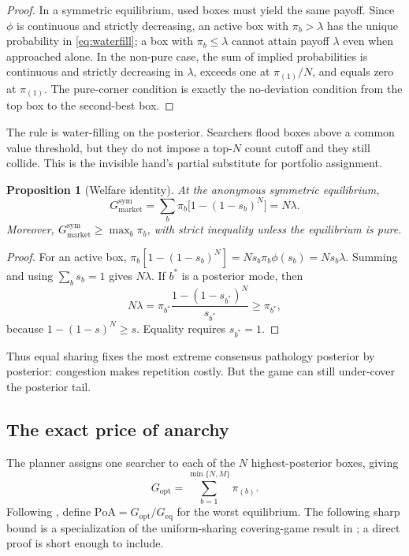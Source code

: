 \documentclass[11pt]{article}
\newtheorem{proposition}{Proposition}
\theoremstyle{definition}
\theoremstyle{remark}
\newcommand{\1}{\mathbf{1}}
\newcommand{\opt}{\mathrm{opt}}
\newcommand{\mkt}{\mathrm{market}}
\newcommand{\PoA}{\mathrm{PoA}}
\begin{document}
\begin{proof}
In a symmetric equilibrium, used boxes must yield the same payoff. Since $\phi$ is continuous and strictly decreasing, an active box with $\pi_b>\lambda$ has the unique probability in \cref{eq:waterfill}; a box with $\pi_b\le\lambda$ cannot attain payoff $\lambda$ even when approached alone. In the non-pure case, the sum of implied probabilities is continuous and strictly decreasing in $\lambda$, exceeds one at $\pi_{(1)}/N$, and equals zero at $\pi_{(1)}$. The pure-corner condition is exactly the no-deviation condition from the top box to the second-best box.
\end{proof}

The rule is water-filling on the posterior. Searchers flood boxes above a common value threshold, but they do not impose a top-$N$ count cutoff and they still collide. This is the invisible hand's partial substitute for portfolio assignment.

\begin{proposition}[Welfare identity]
\label{prop:welfare}
At the anonymous symmetric equilibrium,
\begin{equation}
G_{\mkt}^{\mathrm{sym}}
=\sum_b\pi_b\bigl[1-(1-s_b)^N\bigr]
=N\lambda.
\label{eq:welfare-identity}
\end{equation}
Moreover, $G_{\mkt}^{\mathrm{sym}}\ge\max_b\pi_b$, with strict inequality unless the equilibrium is pure.
\end{proposition}

\begin{proof}
For an active box, $\pi_b[1-(1-s_b)^N]=N s_b\pi_b\phi(s_b)=Ns_b\lambda$. Summing and using $\sum_bs_b=1$ gives $N\lambda$. If $b^*$ is a posterior mode, then
\[
N\lambda=\pi_{b^*}\frac{1-(1-s_{b^*})^N}{s_{b^*}}\ge\pi_{b^*},
\]
because $1-(1-s)^N\ge s$. Equality requires $s_{b^*}=1$.
\end{proof}

Thus equal sharing fixes the most extreme consensus pathology posterior by posterior: congestion makes repetition costly. But the game can still under-cover the posterior tail.

\subsection{The exact price of anarchy}

The planner assigns one searcher to each of the $N$ highest-posterior boxes, giving
\[
G_{\opt}=\sum_{b=1}^{\min\{N,M\}}\pi_{(b)}.
\]
Following \citet{KoutsoupiasPapadimitriou1999}, define $\PoA=G_{\opt}/G_{\mathrm{eq}}$ for the worst equilibrium. The following sharp bound is a specialization of the uniform-sharing covering-game result in \citet{Gairing2009}; a direct proof is short enough to include.
\end{document}
